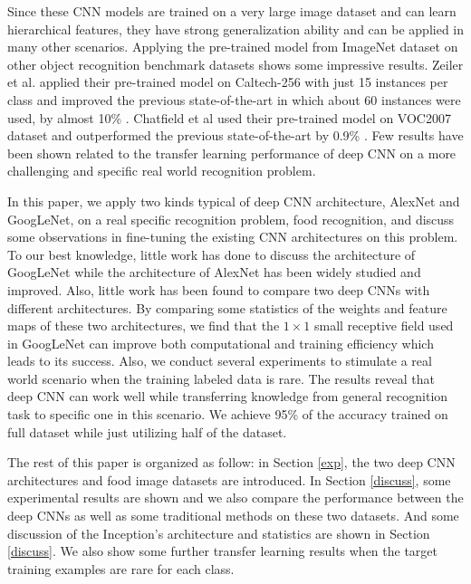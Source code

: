 Since these CNN models are trained on a very large image dataset and can learn hierarchical features, they have strong generalization ability and can be applied in many other scenarios. Applying the pre-trained model from ImageNet dataset on other object recognition benchmark datasets shows some impressive results.
Zeiler et al. applied their pre-trained model on Caltech-256 with just 15 instances per class and improved the previous state-of-the-art in which about 60 instances were used, by almost 10\% \cite{zeiler2014visualizing}.
Chatfield et al used their pre-trained model on VOC2007 dataset and outperformed the previous state-of-the-art by 0.9\% \cite{Chatfield14}.
Few results have been shown related to the transfer learning performance of deep CNN on a more challenging and specific real world recognition problem.

In this paper, we apply two kinds typical of deep CNN architecture, AlexNet and GoogLeNet, on a real specific recognition problem, food recognition, and discuss some observations in fine-tuning the existing CNN architectures on this problem. To our best knowledge, little work has done to discuss the architecture of GoogLeNet while the architecture of AlexNet has been widely studied and improved. Also, little work has been found to compare two deep CNNs with different architectures. By comparing some statistics of the weights and feature maps of these two architectures, we find that the $1\times 1$ small receptive field used in GoogLeNet can improve both computational and training efficiency which leads to its success.
Also, we conduct several experiments to stimulate a real world scenario when the training labeled data is rare. The results reveal that deep CNN can work well while transferring knowledge from general recognition task to specific one in this scenario. We achieve 95\% of the accuracy trained on full dataset while just utilizing half of the dataset.

The rest of this paper is organized as follow: in Section \ref{exp}, the two deep CNN architectures and food image datasets are introduced. In Section \ref{discuss}, some experimental results are shown and we also compare the performance between the deep CNNs as well as some traditional methods on these two datasets. And some discussion of the Inception's architecture and statistics are shown in Section \ref{discuss}. We also show some further transfer learning results when the target training examples are rare for each class.
